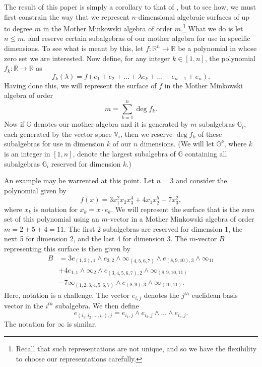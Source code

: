 \documentclass{birkjour}
\theoremstyle{definition}
\theoremstyle{remark}
\numberwithin{equation}{section}
\newcommand{\R}{\mathbb{R}}
\newcommand{\G}{\mathbb{G}}
\newcommand{\V}{\mathbb{V}}
\newcommand{\nvai}{\infty}
\begin{document}
The result of this paper is simply a corollary to that of \cite{Parkin13}, but to see how,
we must first constrain the way that we represent $n$-dimensional algebraic surfaces of up to degree $m$
in the Mother Minkowski algebra of order $m$.\footnote{Recall that such representations are not unique, and so
we have the flexibility to choose our representations carefully.} What we do is let $n\leq m$, and
reserve certain subalgebras of our mother algebra for use in specific dimensions.
To see what is meant by this, let $f:\R^n\to\R$ be a polynomial in whose zero set
we are interested.  Now define, for any integer $k\in[1,n]$, the polynomial $f_k:\R\to\R$ as
\begin{equation*}
f_k(\lambda)=f(e_1+e_2+\dots+\lambda e_k+\dots +e_{n-1}+e_n).
\end{equation*}
Having done this, we will represent the
surface of $f$ in the Mother Minkowski algebra of order
\begin{equation*}
m=\sum_{k=1}^n\deg f_k.
\end{equation*}
Now if $\G$ denotes our mother algebra and it is generated by $m$ subalgebras $\G_i$,
each generated by the vector space $\V_i$, then we reserve $\deg f_k$
of these subalgebras for use in dimension $k$ of our $n$ dimensions.
(We will let $\G^k$, where $k$ is an integer in $[1,n]$, denote the largest
subalgebra of $\G$ containing all subalgebras $\G_i$ reserved for dimension $k$.)

An example may be warrented at this point.  Let $n=3$ and consider the
polynomial given by
\begin{equation}\label{equ_example_poly}
f(x) = 3x_1^2x_2x_3^4 + 4x_1x_2^5 - 7x_3^2,
\end{equation}
where $x_k$ is notation for $x_k=x\cdot e_k$.  We will represent the
surface that is the zero set of this polynomial using an $m$-vector
in a Mother Minkowski algebra of order $m=2+5+4=11$.  The first
2 subalgebras are reserved for dimension 1, the next 5 for dimension
2, and the last 4 for dimension 3.  The $m$-vector $B$
representing this surface is then given by
\begin{align*}
B &= 3e_{(1,2),1}\wedge e_{3,2}\wedge \nvai_{(4,5,6,7)} \wedge e_{(8,9,10),3} \wedge \nvai_{11} \\
 &+ 4e_{1,1}\wedge\nvai_2\wedge e_{(3,4,5,6,7),2}\wedge\nvai_{(8,9,10,11)} \\
 &- 7\nvai_{(1,2,3,4,5,6,7)}\wedge e_{(8,9),3}\wedge\nvai_{(10,11)}.
\end{align*}
Here, notation is a challenge.  The vector $e_{i,j}$ denotes the $j^{th}$ euclidean basis vector
in the $i^{th}$ subalgebra.  We then define
\begin{equation*}
e_{(i_1,i_2,\dots,i_r),j} = e_{i_1,j}\wedge e_{i_2,j}\wedge\dots\wedge e_{i_r,j}.
\end{equation*}
The notation for $\nvai$ is similar.
\end{document}
